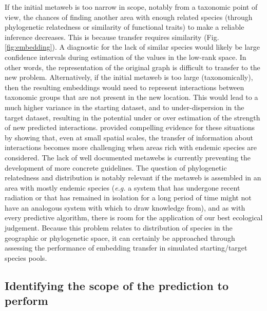 If the initial metaweb is too narrow in scope, notably from a taxonomic
point of view, the chances of finding another area with enough related
species (through phylogenetic relatedness or similarity of functional
traits) to make a reliable inference decreases. This is because transfer
requires similarity (Fig.\ref{fig:embedding}). A diagnostic for the lack of
similar species would likely be large confidence intervals during
estimation of the values in the low-rank space. In other words, the
representation of the original graph is difficult to transfer to the new
problem. Alternatively, if the initial metaweb is too large
(taxonomically), then the resulting embeddings would need to represent
interactions between taxonomic groups that are not present in the new
location. This would lead to a much higher variance in the starting
dataset, and to under-dispersion in the target dataset, resulting in the
potential under or over estimation of the strength of new predicted
interactions. \cite{Llewelyn2022Predicting} provided compelling evidence for
these situations by showing that, even at small spatial scales, the
transfer of information about interactions becomes more challenging when
areas rich with endemic species are considered. The lack of well
documented metawebs is currently preventing the development of more
concrete guidelines. The question of phylogenetic relatedness and
distribution is notably relevant if the metaweb is assembled in an area
with mostly endemic species (\emph{e.g.} a system that has undergone
recent radiation or that has remained in isolation for a long period of
time might not have an analogous system with which to draw knowledge
from), and as with every predictive algorithm, there is room for the
application of our best ecological judgement. Because this problem
relates to distribution of species in the geographic or phylogenetic
space, it can certainly be approached through assessing the performance
of embedding transfer in simulated starting/target species pools.

\subsection{Identifying the scope of the prediction to
perform}\label{identifying-the-scope-of-the-prediction-to-perform}

